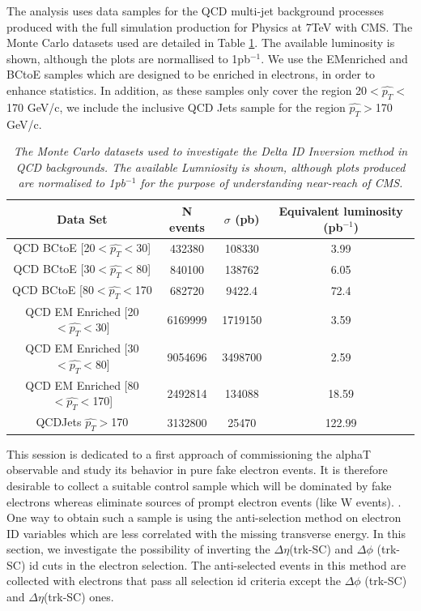 \documentclass{article}
\begin{document}
The analysis uses data samples for the QCD multi-jet background processes produced with the full simulation production for Physics at 7TeV with CMS. The Monte Carlo datasets used are detailed in Table \ref{tab:datasets}. The available luminosity is shown, although the plots are normallised to 1pb$^{-1}$. We use the EMenriched and BCtoE samples which are designed to be enriched in electrons, in order to enhance statistics. In addition, as these samples only cover the region 20$<\hat{p_{T}}<$170 GeV/c, we include the inclusive QCD Jets sample for the region $\hat{p_{T}}>$170 GeV/c.

\begin{table}[h!]
\begin{center}
\begin{tabular}{|c|c|c|c|}
\hline
Data Set & N events & $\sigma$ (pb) & Equivalent luminosity (pb$^{-1}$)\\
\hline
QCD BCtoE [20$<\hat{p_{T}}<$30]& 432380  & 108330 & 3.99\\
QCD BCtoE [30$<\hat{p_{T}}<$80] & 840100 & 138762 & 6.05\\
QCD BCtoE [80$<\hat{p_{T}}<$170 & 682720 & 9422.4 &72.4\\
QCD EM Enriched [20$<\hat{p_{T}}<$30] & 6169999 & 1719150 & 3.59\\
QCD EM Enriched [30$<\hat{p_{T}}<$80] & 9054696 & 3498700 & 2.59\\
QCD EM Enriched [80$<\hat{p_{T}}<$170] & 2492814 & 134088 & 18.59\\
QCDJets $\hat{p_{T}}>$170 & 3132800 & 25470 & 122.99\\


\hline

\end{tabular}
\end{center}
\caption{\textit{The Monte Carlo datasets used to investigate the Delta ID Inversion method in QCD backgrounds. The available Lumniosity is shown, although plots produced are normalised to 1pb$^{-1}$ for the purpose of understanding near-reach of CMS.}}
\label{tab:datasets}
\end{table}

This session is dedicated to a first approach of commissioning the alphaT observable and study its behavior in pure fake electron events. It is therefore desirable to collect a suitable control sample which will be dominated by fake electrons whereas eliminate sources of prompt electron events (like W events).
. One way to obtain such a sample is using the anti-selection method on electron ID variables which are less correlated with the missing transverse energy. In this section, we investigate the possibility of inverting the $\Delta \eta$(trk-SC) and $\Delta \phi$ (trk-SC) id cuts in the electron selection. The anti-selected events in this method are collected with electrons that pass all selection id criteria except the $\Delta \phi$ (trk-SC) and $\Delta \eta$(trk-SC) ones. 
\end{document}
